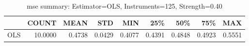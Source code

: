 \begin{table}[ht]
\centering
\caption{mse summary: Estimator=OLS, Instruments=125, Strength=0.40}
\begin{tabular}{lrrrrrrrr}
\toprule
 & COUNT & MEAN & STD & MIN & 25\% & 50\% & 75\% & MAX \\
\midrule
OLS & 10.0000 & 0.4738 & 0.0429 & 0.4077 & 0.4391 & 0.4848 & 0.4923 & 0.5551 \\
\bottomrule
\end{tabular}
\end{table}
